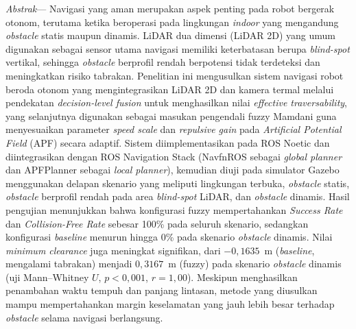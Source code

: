 \documentclass[10pt,twocolumn]{article}
\begin{document}

\noindent\textit{Abstrak}— Navigasi yang aman merupakan aspek penting pada robot bergerak otonom, terutama ketika beroperasi pada lingkungan \textit{indoor} yang mengandung \textit{obstacle} statis maupun dinamis. LiDAR dua dimensi (LiDAR 2D) yang umum digunakan sebagai sensor utama navigasi memiliki keterbatasan berupa \textit{blind-spot} vertikal, sehingga \textit{obstacle} berprofil rendah berpotensi tidak terdeteksi dan meningkatkan risiko tabrakan. Penelitian ini mengusulkan sistem navigasi robot beroda otonom yang mengintegrasikan LiDAR 2D dan kamera termal melalui pendekatan \textit{decision-level fusion} untuk menghasilkan nilai \textit{effective traversability}, yang selanjutnya digunakan sebagai masukan pengendali fuzzy Mamdani guna menyesuaikan parameter \textit{speed scale} dan \textit{repulsive gain} pada \textit{Artificial Potential Field} (APF) secara adaptif. Sistem diimplementasikan pada ROS Noetic dan diintegrasikan dengan ROS Navigation Stack (NavfnROS sebagai \textit{global planner} dan APFPlanner sebagai \textit{local planner}), kemudian diuji pada simulator Gazebo menggunakan delapan skenario yang meliputi lingkungan terbuka, \textit{obstacle} statis, \textit{obstacle} berprofil rendah pada area \textit{blind-spot} LiDAR, dan \textit{obstacle} dinamis. Hasil pengujian menunjukkan bahwa konfigurasi fuzzy mempertahankan \textit{Success Rate} dan \textit{Collision-Free Rate} sebesar 100\% pada seluruh skenario, sedangkan konfigurasi \textit{baseline} menurun hingga 0\% pada skenario \textit{obstacle} dinamis. Nilai \textit{minimum clearance} juga meningkat signifikan, dari $-0{,}1635$~m (\textit{baseline}, mengalami tabrakan) menjadi $0{,}3167$~m (fuzzy) pada skenario \textit{obstacle} dinamis (uji Mann--Whitney $U$, $p<0{,}001$, $r=1{,}00$). Meskipun menghasilkan penambahan waktu tempuh dan panjang lintasan, metode yang diusulkan mampu mempertahankan margin keselamatan yang jauh lebih besar terhadap \textit{obstacle} selama navigasi berlangsung.
\end{document}
